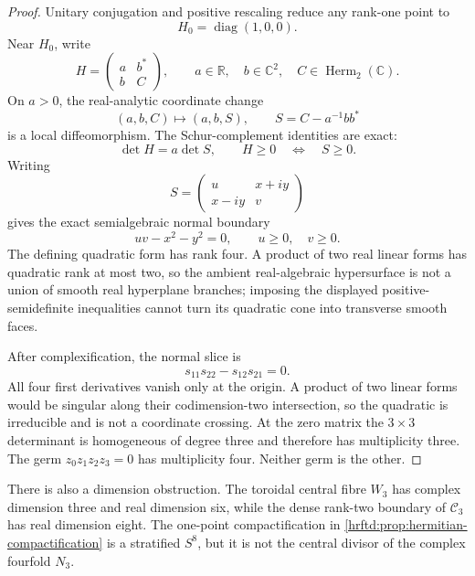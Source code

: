 \begin{proof}
Unitary conjugation and positive rescaling reduce any rank-one point to
\[
 H_0=\operatorname{diag}(1,0,0).
\]
Near \(H_0\), write
\[
 H=
 \begin{pmatrix}a&b^*\\b&C\end{pmatrix},
 \qquad
 a\in\mathbb R,\quad b\in\mathbb C^2,\quad
 C\in\operatorname{Herm}_2(\mathbb C).
\]
On \(a>0\), the real-analytic coordinate change
\[
 (a,b,C)\longmapsto(a,b,S),\qquad
 S=C-a^{-1}bb^*
\]
is a local diffeomorphism.  The Schur-complement identities are exact:
\begin{equation}
 \det H=a\det S,\qquad
 H\ge0\quad\Longleftrightarrow\quad S\ge0.
 \label{hrftd:eq:schur}
\end{equation}
Writing
\[
 S=\begin{pmatrix}u&x+iy\\x-iy&v\end{pmatrix}
\]
gives the exact semialgebraic normal boundary
\begin{equation}
 uv-x^2-y^2=0,\qquad u\ge0,\quad v\ge0.
 \label{hrftd:eq:quadratic-cone}
\end{equation}
The defining quadratic form has rank four.  A product of two real linear
forms has quadratic rank at most two, so the ambient real-algebraic
hypersurface is not a union of smooth real hyperplane branches; imposing the
displayed positive-semidefinite inequalities cannot turn its quadratic cone
into transverse smooth faces.

After complexification, the normal slice is
\[
 s_{11}s_{22}-s_{12}s_{21}=0.
\]
All four first derivatives vanish only at the origin.  A product of two
linear forms would be singular along their codimension-two intersection, so
the quadratic is irreducible and is not a coordinate crossing.  At the zero
matrix the \(3\times3\) determinant is homogeneous of degree three and
therefore has multiplicity three.  The germ
\(z_0z_1z_2z_3=0\) has multiplicity four.  Neither germ is the other.
\end{proof}

There is also a dimension obstruction.  The toroidal central fibre \(W_3\)
has complex dimension three and real dimension six, while the dense rank-two
boundary of \(\mathcal C_3\) has real dimension eight.  The one-point
compactification in \cref{hrftd:prop:hermitian-compactification} is a
stratified \(S^8\), but it is not the central divisor of the complex
fourfold \(N_3\).

